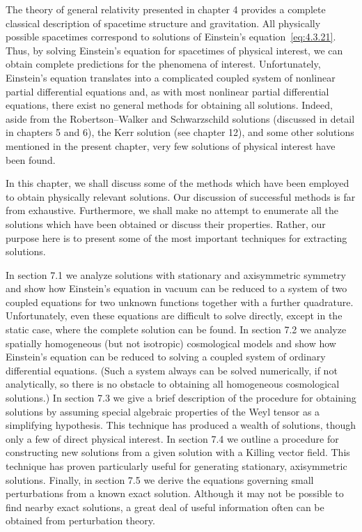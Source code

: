 
The theory of general relativity presented in chapter 4 provides a complete
classical description of spacetime structure and gravitation. All physically possible
spacetimes correspond to solutions of Einstein's equation~\eqref{eq:4.3.21}. Thus,
by solving Einstein's equation for spacetimes of physical interest, we can obtain
complete predictions for the phenomena of interest. Unfortunately, Einstein's
equation translates into a complicated coupled system of nonlinear partial
differential equations and, as with most nonlinear partial differential equations,
there exist no general methods for obtaining all solutions. Indeed, aside from the
Robertson--Walker and Schwarzschild solutions (discussed in detail in chapters 5
and 6), the Kerr solution (see chapter 12), and some other solutions mentioned in the
present chapter, very few solutions of physical interest have been found.

In this chapter, we shall discuss some of the methods which have been employed to
obtain physically relevant solutions. Our discussion of successful methods is far
from exhaustive. Furthermore, we shall make no attempt to enumerate all the
solutions which have been obtained or discuss their properties. Rather, our purpose
here is to present some of the most important techniques for extracting solutions.

In section 7.1 we analyze solutions with stationary and axisymmetric symmetry and
show how Einstein's equation in vacuum can be reduced to a system of two coupled
equations for two unknown functions together with a further quadrature.
Unfortunately, even these equations are difficult to solve directly, except in the
static case, where the complete solution can be found. In section 7.2 we analyze
spatially homogeneous (but not isotropic) cosmological models and show how
Einstein's equation can be reduced to solving a coupled system of ordinary
differential equations. (Such a system always can be solved numerically, if not
analytically, so there is no obstacle to obtaining all homogeneous cosmological
solutions.) In section 7.3 we give a brief description of the procedure for obtaining
solutions by assuming special algebraic properties of the Weyl tensor as a
simplifying hypothesis. This technique has produced a wealth of solutions, though
only a few of direct physical interest. In section 7.4 we outline a procedure for
constructing new solutions from a given solution with a Killing vector field. This
technique has proven particularly useful for generating stationary, axisymmetric
solutions. Finally, in section 7.5 we derive the equations governing small
perturbations from a known exact solution. Although it may not be possible to find
nearby exact solutions, a great deal of useful information often can be obtained from
perturbation theory.
